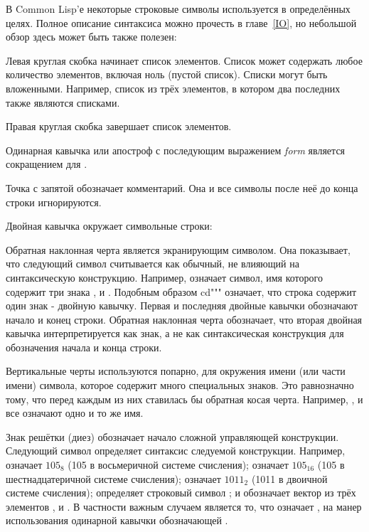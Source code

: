 В Common Lisp'е некоторые строковые символы используется в определённых целях. Полное
описание синтаксиса можно прочесть в главе~\ref{IO}, но небольшой обзор здесь
может быть также полезен:
\begin{indentdesc}{1.2pc}
\item[\cd{(}]
Левая круглая скобка начинает список элементов. Список может содержать любое
количество элементов, включая ноль (пустой список). Списки могут быть
вложенными. Например,  список из трёх элементов, в
котором два последних также являются списками.

\item[\cd{)}] Правая круглая скобка завершает список элементов.

\item[\cd{\Xquote}] Одинарная кавычка или апостроф с последующим выражением {\it
form} является сокращением для . 

\item[\cd{;}] Точка с запятой обозначает комментарий. Она и все символы после
неё до конца строки игнорируются.

\item[\cd{"}] Двойная кавычка окружает символьные строки: \\

\item[\cd{{\Xbackslash}}] Обратная наклонная черта является экранирующим
символом. Она показывает, что следующий символ считывается как обычный, не
влияющий на синтаксическую конструкцию. Например,  означает
символ, имя которого содержит три знака , \cd{(} и . Подобным
образом  cd{"{\Xbackslash}""} означает, что строка содержит один знак - двойную
кавычку. Первая и последняя двойные кавычки обозначают начало и конец
строки. Обратная наклонная черта обозначает, что вторая двойная кавычка
интерпретируется как знак, а не как синтаксическая конструкция для обозначения
начала и конца строки.

\item[\cd{|}] Вертикальные черты используются попарно, для окружения имени (или
части имени) символа, которое содержит много специальных знаков. Это равнозначно
тому, что перед каждым из них ставилась бы обратная косая
черта. Например, , 
и  все означают одно и то же имя.

\item[\cd{\#}] Знак решётки (диез) обозначает начало сложной управляющей
конструкции. Следующий символ определяет синтаксис следуемой конструкции.
Например,  означает $105_{8}$ (105 в восьмеричной системе счисления);
 означает $105_{16}$ (105 в шестнадцатеричной системе счисления);
 означает $1011_{2}$ (1011 в двоичной системе счисления);
 определяет строковый символ ; и 
обозначает вектор из трёх элементов ,  и . В частности важным
случаем является то, что  означает , на
манер использования одинарной кавычки  обозначающей .


\end{indentdesc}
